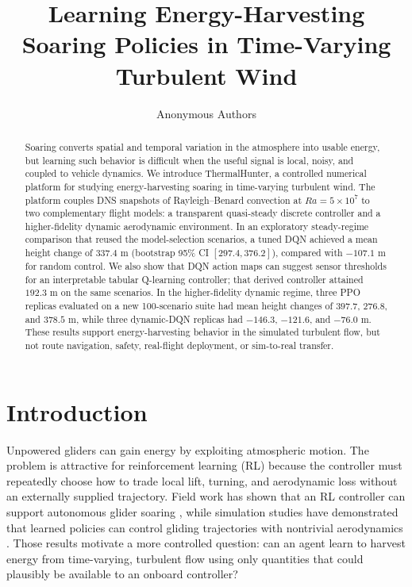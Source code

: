 \documentclass{article}
\title{Learning Energy-Harvesting Soaring Policies in Time-Varying Turbulent Wind}
\author{Anonymous Authors}
\begin{document}
\maketitle

\begin{abstract}
Soaring converts spatial and temporal variation in the atmosphere into usable
energy, but learning such behavior is difficult when the useful signal is local,
noisy, and coupled to vehicle dynamics.  We introduce ThermalHunter, a
controlled numerical platform for studying energy-harvesting soaring in
time-varying turbulent wind.  The platform couples DNS snapshots of
Rayleigh--Benard convection at $Ra=5\times10^{7}$ to two complementary flight
  models: a transparent quasi-steady discrete controller and a higher-fidelity
  dynamic aerodynamic environment.  In an exploratory steady-regime comparison
  that reused the model-selection scenarios, a tuned DQN achieved a mean height
  change of $337.4$ m (bootstrap 95\% CI $[297.4,376.2]$), compared with
  $-107.1$ m for random control.  We also show that DQN action maps can suggest
  sensor thresholds for an interpretable tabular Q-learning controller; that
  derived controller attained $192.3$ m on the same scenarios.  In the
  higher-fidelity dynamic regime, three PPO
  replicas evaluated on a new 100-scenario suite had mean height changes of
  $397.7$, $276.8$, and $378.5$ m, while three dynamic-DQN replicas had
  $-146.3$, $-121.6$, and $-76.0$ m.  These results support energy-harvesting
  behavior in the simulated turbulent flow, but not route navigation, safety,
  real-flight deployment, or sim-to-real transfer.
\end{abstract}

\section{Introduction}

Unpowered gliders can gain energy by exploiting atmospheric motion.  The
problem is attractive for reinforcement learning (RL) because the controller
must repeatedly choose how to trade local lift, turning, and aerodynamic loss
without an externally supplied trajectory.  Field work has shown that an RL
controller can support autonomous glider soaring \citep{reddy2018}, while
simulation studies have demonstrated that learned policies can control gliding
trajectories with nontrivial aerodynamics \citep{novati2019}.  Those results
motivate a more controlled question: can an agent learn to harvest energy from
time-varying, turbulent flow using only quantities that could plausibly be
available to an onboard controller?
\end{document}

